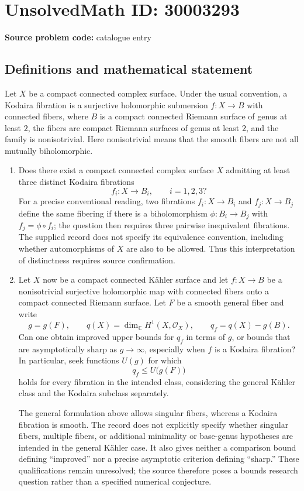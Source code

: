 \documentclass[11pt]{article}
\newcommand{\C}{\mathbb{C}}
\begin{document}
\section*{UnsolvedMath ID: 30003293}
\textbf{Source problem code:} catalogue entry
\subsection{Definitions and mathematical statement}
Let \(X\) be a compact connected complex surface. Under the usual convention, a Kodaira fibration is a surjective holomorphic submersion \(f\colon X\to B\) with connected fibers, where \(B\) is a compact connected Riemann surface of genus at least \(2\), the fibers are compact Riemann surfaces of genus at least \(2\), and the family is nonisotrivial. Here nonisotrivial means that the smooth fibers are not all mutually biholomorphic.

\begin{enumerate}
\item Does there exist a compact connected complex surface \(X\) admitting at least three distinct Kodaira fibrations
\[
 f_i\colon X\longrightarrow B_i,\qquad i=1,2,3?
\]
For a precise conventional reading, two fibrations \(f_i\colon X\to B_i\) and \(f_j\colon X\to B_j\) define the same fibering if there is a biholomorphism \(\phi\colon B_i\to B_j\) with \(f_j=\phi\circ f_i\); the question then requires three pairwise inequivalent fibrations. The supplied record does not specify its equivalence convention, including whether automorphisms of \(X\) are also to be allowed. Thus this interpretation of distinctness requires source confirmation.

\item Let \(X\) now be a compact connected K\"ahler surface and let \(f\colon X\to B\) be a nonisotrivial surjective holomorphic map with connected fibers onto a compact connected Riemann surface. Let \(F\) be a smooth general fiber and write
\[
 g=g(F),\qquad q(X)=\dim_{\C}H^1(X,\mathcal O_X),\qquad q_f=q(X)-g(B).
\]
Can one obtain improved upper bounds for \(q_f\) in terms of \(g\), or bounds that are asymptotically sharp as \(g\to\infty\), especially when \(f\) is a Kodaira fibration? In particular, seek functions \(U(g)\) for which
\[
 q_f\le U\bigl(g(F)\bigr)
\]
holds for every fibration in the intended class, considering the general K\"ahler class and the Kodaira subclass separately.

The general formulation above allows singular fibers, whereas a Kodaira fibration is smooth. The record does not explicitly specify whether singular fibers, multiple fibers, or additional minimality or base-genus hypotheses are intended in the general K\"ahler case. It also gives neither a comparison bound defining ``improved'' nor a precise asymptotic criterion defining ``sharp.'' These qualifications remain unresolved; the source therefore poses a bounds research question rather than a specified numerical conjecture.
\end{enumerate}
\end{document}
